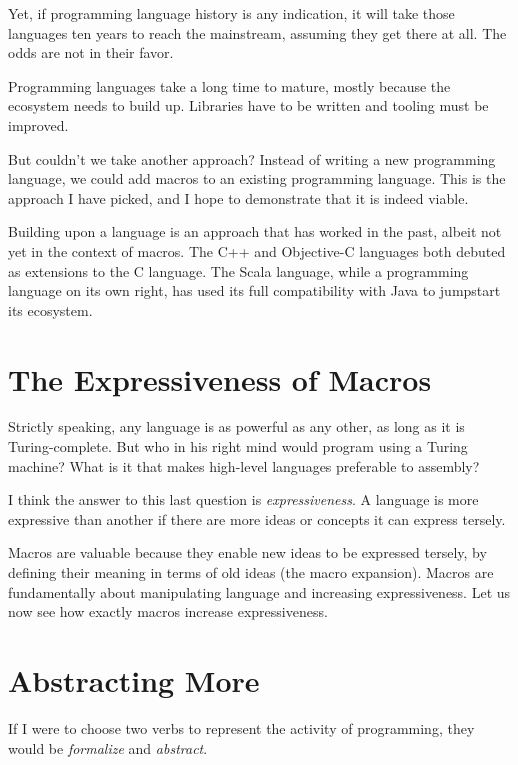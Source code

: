 Yet, if programming language history is any indication, it will take those
languages ten years to reach the mainstream, assuming they get there at all. The
odds are not in their favor.

Programming languages take a long time to mature, mostly because the ecosystem
needs to build up. Libraries have to be written and tooling must be improved.

But couldn't we take another approach? Instead of writing a new programming
language, we could add macros to an existing programming language. This is the
approach I have picked, and I hope to demonstrate that it is indeed viable.

Building upon a language is an approach that has worked in the past, albeit not
yet in the context of macros. The C++ and Objective-C languages both debuted as
extensions to the C language. The Scala language, while a programming language
on its own right, has used its full compatibility with Java to jumpstart its
ecosystem.

\section{The Expressiveness of Macros}

Strictly speaking, any language is as powerful as any other, as long as it is
Turing-complete. But who in his right mind would program using a Turing machine?
What is it that makes high-level languages preferable to assembly?

I think the answer to this last question is \emph{expressiveness}. A language is
more expressive than another if there are more ideas or concepts it can express
tersely.

Macros are valuable because they enable new ideas to be expressed tersely, by
defining their meaning in terms of old ideas (the macro expansion). Macros are
fundamentally about manipulating language and increasing expressiveness. Let us
now see how exactly macros increase expressiveness.

\section{Abstracting More}

If I were to choose two verbs to represent the activity of programming, they
would be \emph{formalize} and \emph{abstract}.

